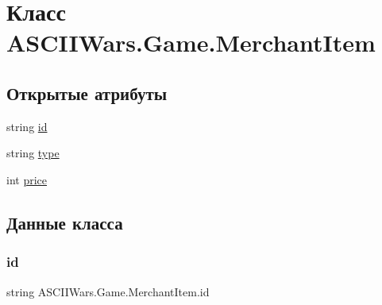 \hypertarget{class_a_s_c_i_i_wars_1_1_game_1_1_merchant_item}{}\section{Класс A\+S\+C\+I\+I\+Wars.\+Game.\+Merchant\+Item}
\label{class_a_s_c_i_i_wars_1_1_game_1_1_merchant_item}
\subsection*{Открытые атрибуты}
\begin{DoxyCompactItemize}
\item 
string \hyperlink{class_a_s_c_i_i_wars_1_1_game_1_1_merchant_item_a43704fae44c4c55cb243bb6922558e12}{id}
\item 
string \hyperlink{class_a_s_c_i_i_wars_1_1_game_1_1_merchant_item_a0621b09ff9dc3029f660e32b90db815c}{type}
\item 
int \hyperlink{class_a_s_c_i_i_wars_1_1_game_1_1_merchant_item_af1b4ca7cc021067017ece68cc0145631}{price}
\end{DoxyCompactItemize}


\subsection{Данные класса}
\hypertarget{class_a_s_c_i_i_wars_1_1_game_1_1_merchant_item_a43704fae44c4c55cb243bb6922558e12}{}\label{class_a_s_c_i_i_wars_1_1_game_1_1_merchant_item_a43704fae44c4c55cb243bb6922558e12} 
\subsubsection{\texorpdfstring{id}{id}}
{\footnotesize\ttfamily string A\+S\+C\+I\+I\+Wars.\+Game.\+Merchant\+Item.\+id}

\hypertarget{class_a_s_c_i_i_wars_1_1_game_1_1_merchant_item_af1b4ca7cc021067017ece68cc0145631}{}\label{class_a_s_c_i_i_wars_1_1_game_1_1_merchant_item_af1b4ca7cc021067017ece68cc0145631} 
